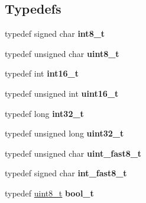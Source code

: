 \subsection*{Typedefs}
\begin{DoxyCompactItemize}
\item 
\hypertarget{group__hal__hcs08_gaef44329758059c91c76d334e8fc09700}{typedef signed char {\bfseries int8\-\_\-t}}\label{group__hal__hcs08_gaef44329758059c91c76d334e8fc09700}

\item 
\hypertarget{group__hal__hcs08_gaba7bc1797add20fe3efdf37ced1182c5}{typedef unsigned char {\bfseries uint8\-\_\-t}}\label{group__hal__hcs08_gaba7bc1797add20fe3efdf37ced1182c5}

\item 
\hypertarget{group__hal__hcs08_gab5525e8f9f02c79fbadd0f03ff724e23}{typedef int {\bfseries int16\-\_\-t}}\label{group__hal__hcs08_gab5525e8f9f02c79fbadd0f03ff724e23}

\item 
\hypertarget{group__hal__hcs08_ga1f1825b69244eb3ad2c7165ddc99c956}{typedef unsigned int {\bfseries uint16\-\_\-t}}\label{group__hal__hcs08_ga1f1825b69244eb3ad2c7165ddc99c956}

\item 
\hypertarget{group__hal__hcs08_ga0d2e949ab6a1bb62f1b295cc79bc1f60}{typedef long {\bfseries int32\-\_\-t}}\label{group__hal__hcs08_ga0d2e949ab6a1bb62f1b295cc79bc1f60}

\item 
\hypertarget{group__hal__hcs08_ga06896e8c53f721507066c079052171f8}{typedef unsigned long {\bfseries uint32\-\_\-t}}\label{group__hal__hcs08_ga06896e8c53f721507066c079052171f8}

\item 
\hypertarget{group__hal__hcs08_ga2d31063fef649c85396fb28130ef9795}{typedef unsigned char {\bfseries uint\-\_\-fast8\-\_\-t}}\label{group__hal__hcs08_ga2d31063fef649c85396fb28130ef9795}

\item 
\hypertarget{group__hal__hcs08_gafa981e0352f65c207364c9cb82246b53}{typedef signed char {\bfseries int\-\_\-fast8\-\_\-t}}\label{group__hal__hcs08_gafa981e0352f65c207364c9cb82246b53}

\item 
\hypertarget{group__hal__hcs08_ga57c3b7201116536b822f0f8520aa99c7}{typedef \hyperlink{group__hal_gae1affc9ca37cfb624959c866a73f83c2}{uint8\-\_\-t} {\bfseries bool\-\_\-t}}\label{group__hal__hcs08_ga57c3b7201116536b822f0f8520aa99c7}

\end{DoxyCompactItemize}
